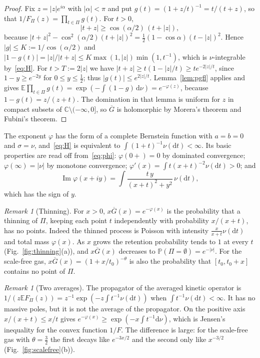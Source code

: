 \documentclass[aps,prd,twocolumn,superscriptaddress,nofootinbib,longbibliography,floatfix,amsmath,amssymb,10pt]{revtex4-2}
\theoremstyle{definition}
\theoremstyle{remark}
\newtheorem{remark}[theorem]{Remark}
\newcommand{\C}{\mathbb{C}}
\newcommand{\E}{\mathbb{E}}
\renewcommand{\P}{\mathbb{P}}
\newcommand{\Gbar}{\overline{G}}
\newcommand{\dd}{\mathrm{d}}
\newcommand{\cut}{\C\setminus(-\infty,0]}
\DeclareMathOperator{\im}{Im}
\begin{document}
\begin{proof}
Fix $z=|z|e^{i\alpha}$ with $|\alpha|<\pi$ and put
$g(t)=(1+z/t)^{-1}=t/(t+z)$, so that $1/F_\Pi(z)=\prod_{t\in\Pi}g(t)$. For
$t>0$,
\begin{equation}\label{eq:halfangle}
|t+z|\ge\cos(\alpha/2)\,(t+|z|),
\end{equation}
because $|t+z|^2-\cos^2(\alpha/2)(t+|z|)^2=\frac12(1-\cos\alpha)(t-|z|)^2$.
Hence $|g|\le K:=1/\cos(\alpha/2)$ and
$|1-g(t)|=|z|/|t+z|\le K\max(1,|z|)\min(1,t^{-1})$, which is
$\nu$-integrable by~\eqref{eq:H}. For $t>T:=2|z|$ we have
$|t+z|\ge t(1-|z|/t)\ge te^{-2|z|/t}$, since $1-y\ge e^{-2y}$ for $0\le
y\le\frac12$; thus $|g(t)|\le e^{2|z|/t}$. Lemma~\ref{lem:pgfl} applies and
gives $\E\prod_{t\in\Pi}g(t)=\exp(-\int(1-g)\,\dd\nu)=e^{-\varphi(z)}$, because
$1-g(t)=z/(z+t)$. The domination in that lemma is uniform for $z$ in compact
subsets of $\cut$, so $\Gbar$ is holomorphic by Morera's theorem and Fubini's
theorem.
\end{proof}

The exponent $\varphi$ has the form of a complete Bernstein function with
$a=b=0$ and $\sigma=\nu$, and~\eqref{eq:H} is equivalent to
$\int(1+t)^{-1}\nu(\dd t)<\infty$. Its basic properties are read off
from~\eqref{eq:phi}: $\varphi(0+)=0$ by dominated convergence;
$\varphi(\infty)=|\nu|$ by monotone convergence;
$\varphi'(x)=\int t(x+t)^{-2}\nu(\dd t)>0$; and
\begin{equation}\label{eq:imphi}
\im\varphi(x+iy)=\int\frac{t\,y}{(x+t)^2+y^2}\,\nu(\dd t),
\end{equation}
which has the sign of $y$.

\begin{remark}[Thinning]\label{rem:thinning}
For $x>0$, $x\Gbar(x)=e^{-\varphi(x)}$ is the probability that a thinning of
$\Pi$, keeping each point $t$ independently with probability $x/(x+t)$, has
no points. Indeed the thinned process is Poisson with intensity
$\frac{x}{x+t}\nu(\dd t)$ and total mass $\varphi(x)$. As $x$ grows the
retention probability tends to $1$ at every $t$
(Fig.~\ref{fig:thinning}(a)), and $x\Gbar(x)$ decreases to
$\P(\Pi=\emptyset)=e^{-|\nu|}$. For the scale-free gas, $x\Gbar(x)=(1+x/t_0)^{-\theta}$
is also the probability that $[t_0,t_0+x]$ contains no point of $\Pi$.
\end{remark}

\begin{remark}[Two averages]\label{rem:jensen}
The propagator of the averaged kinetic operator is $1/(z\E F_\Pi(z))=z^{-1}
\exp(-z\int t^{-1}\nu(\dd t))$ when $\int t^{-1}\nu(\dd t)<\infty$. It has no
massive poles, but it is not the average of the propagator. On the positive
axis $x/(x+t)\le x/t$ gives $e^{-\varphi(x)}\ge\exp(-x\int t^{-1}\dd\nu)$,
which is Jensen's inequality for the convex function $1/F$. The difference is
large: for the scale-free gas with $\theta=\frac32$ the first decays like
$e^{-3x/2}$ and the second only like $x^{-3/2}$
(Fig.~\ref{fig:scalefree}(b)).
\end{remark}
\end{document}
